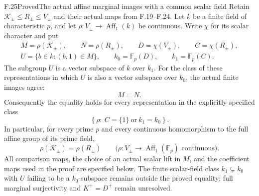 \begin{claim}{F.25}{Proved}{The actual affine marginal images with a common scalar field}
Retain $\mathcal K_\pm\leq R_\pm\leq V_\pm$ and their
actual maps from F.19--F.24. Let $k$ be a finite field
of characteristic $p$, and let
$\rho:V_\pm\to\operatorname{Aff}_1(k)$ be continuous.
Write $\chi$ for its scalar character and put
\[
 \begin{gathered}
 M=\rho(\mathcal K_\pm),\qquad N=\rho(R_\pm),\qquad
 D=\chi(V_\pm),\qquad C=\chi(R_\pm),\\
 U=\{b\in k:(b,1)\in M\},\qquad
 k_0=\mathbb F_p(D),\qquad k_1=\mathbb F_p(C).
 \end{gathered}                                                \tag{F.25.1}
\]
The subgroup $U$ is a vector subspace of $k$ over
$k_1$. For the class of these representations in
which $U$ is also a vector subspace over $k_0$, the
actual finite images agree:
\[
                              M=N.                            \tag{F.25.2}
\]
Consequently the equality holds for every representation
in the explicitly specified class
\[
 \left\{\rho:\ C=\{1\}\ \text{or}\ k_1=k_0\right\}.
                                                               \tag{F.25.3}
\]
In particular, for every prime $p$ and every continuous
homomorphism to the full affine group of its prime field,
\[
 \rho(\mathcal K_\pm)=\rho(R_\pm)
       \qquad\bigl(\rho:V_\pm\to\operatorname{Aff}_1(\mathbb F_p)
                       \text{ continuous}\bigr).             \tag{F.25.4}
\]
All comparison maps, the choice of an actual scalar
lift in $M$, and the coefficient maps used in the proof
are specified below. The finite scalar-field class
$k_1\subsetneq k_0$ with $U$ failing to be a $k_0$-subspace
remains outside the proved equality; full marginal
surjectivity and $K^+=D^+$ remain unresolved.
\end{claim}

